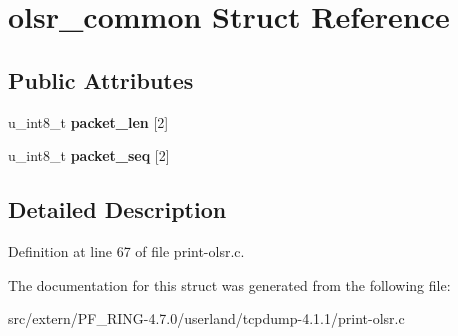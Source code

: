 \hypertarget{structolsr__common}{
\section{olsr\_\-common Struct Reference}
\label{structolsr__common}
}
\subsection*{Public Attributes}
\begin{DoxyCompactItemize}
\item 
\hypertarget{structolsr__common_a7742c4bf343100ca88a47e18614f8e15}{
u\_\-int8\_\-t {\bfseries packet\_\-len} \mbox{[}2\mbox{]}}
\label{structolsr__common_a7742c4bf343100ca88a47e18614f8e15}

\item 
\hypertarget{structolsr__common_a231310aa3b3eafdb806ab1c7f157fa51}{
u\_\-int8\_\-t {\bfseries packet\_\-seq} \mbox{[}2\mbox{]}}
\label{structolsr__common_a231310aa3b3eafdb806ab1c7f157fa51}

\end{DoxyCompactItemize}


\subsection{Detailed Description}


Definition at line 67 of file print-\/olsr.c.



The documentation for this struct was generated from the following file:\begin{DoxyCompactItemize}
\item 
src/extern/PF\_\-RING-\/4.7.0/userland/tcpdump-\/4.1.1/print-\/olsr.c\end{DoxyCompactItemize}
